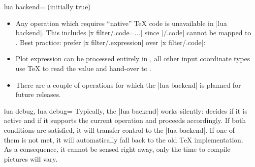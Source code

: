{\begin{pgfplotskey}{lua backend= (initially true)}
\begin{itemize}
            Both are semantically equivalent, but since \lua{} cannot interpret
            \TeX{} macros, it refuses to process the ``Don't'' case. The
            ``Don't'' case results in a log message
\begin{verbatim}
Package pgfplots info on input line 16: Deactivating LUA version of
plot expression for plot 0 (type 'pgfplothandlerlineto'):
y expression '\constantC *x' contains a TeX macro.
\end{verbatim}
        \item Any operation which requires ``native'' \TeX{} code is
            unavailable in |lua backend|. This includes
            |x filter/.code={...}| since |/.code| cannot be mapped to \lua.
            Best practice: prefer |x filter/.expression| over |x filter/.code|:
\begin{codeexample}[]
\end{codeexample}
        \item Plot expression can be processed entirely in \lua, all other
            input coordinate types use \TeX{} to read the value and hand-over
            to \lua.
        \item There are a couple of operations for which the |lua backend| is
            planned for future releases.
    \end{itemize}
\end{pgfplotskey}

\begin{pgfplotskeylist}{%
    lua debug,
    lua debug=%
}
    Typically, the |lua backend| works silently: \PGFPlots{} decides if it is
    active and if it supports the current operation and proceeds accordingly.
    If both conditions are satisfied, it will transfer control to the
    |lua backend|. If one of them is not met, it will automatically fall back
    to the old \TeX{} implementation. As a consequence, it cannot be sensed
    right away, only the time to compile pictures will vary.


\end{pgfplotskeylist}}
